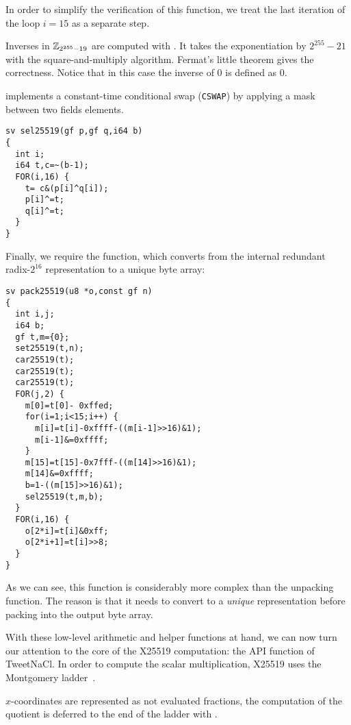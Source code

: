 In order to simplify the verification of this function,
we treat the last iteration of the loop $i = 15$ as a separate step.

Inverses in $\mathbb{Z}_{2^{255}-19}$ are computed with .
It takes the exponentiation by $2^{255}-21$ with the square-and-multiply algorithm.
Fermat's little theorem gives the correctness.
Notice that in this case the inverse of $0$ is defined as $0$.

 implements a constant-time conditional swap (\texttt{CSWAP}) by
applying a mask between two fields elements.
\begin{lstlisting}[language=Ctweetnacl]
sv sel25519(gf p,gf q,i64 b)
{
  int i;
  i64 t,c=~(b-1);
  FOR(i,16) {
    t= c&(p[i]^q[i]);
    p[i]^=t;
    q[i]^=t;
  }
}
\end{lstlisting}

Finally, we require the  function,
which converts from the internal redundant radix-$2^{16}$
representation to a unique byte array:
\begin{lstlisting}[language=Ctweetnacl]
sv pack25519(u8 *o,const gf n)
{
  int i,j;
  i64 b;
  gf t,m={0};
  set25519(t,n);
  car25519(t);
  car25519(t);
  car25519(t);
  FOR(j,2) {
    m[0]=t[0]- 0xffed;
    for(i=1;i<15;i++) {
      m[i]=t[i]-0xffff-((m[i-1]>>16)&1);
      m[i-1]&=0xffff;
    }
    m[15]=t[15]-0x7fff-((m[14]>>16)&1);
    m[14]&=0xffff;
    b=1-((m[15]>>16)&1);
    sel25519(t,m,b);
  }
  FOR(i,16) {
    o[2*i]=t[i]&0xff;
    o[2*i+1]=t[i]>>8;
  }
}
\end{lstlisting}
As we can see, this function is considerably more complex than the
unpacking function. The reason is that it needs to convert
to a \emph{unique} representation before packing into the output
byte array.

With these low-level arithmetic and helper functions at hand, we can now
turn our attention to the core of the X25519 computation:
the  API function of TweetNaCl.
In order to compute the scalar multiplication,
X25519 uses the Montgomery ladder~\cite{Mon85}.

$x$-coordinates are represented as not evaluated fractions, the computation of
the quotient is deferred to the end of the ladder with .

